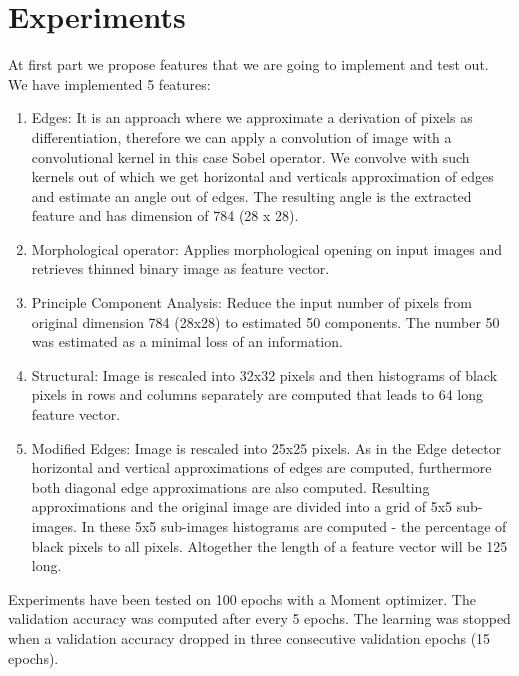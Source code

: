 \documentclass[journal]{IEEEtran}
\begin{document}
\section{Experiments}
At first part we propose features that we are going to implement and test out. We have implemented 5 features:
\begin{enumerate}
\item{Edges:}
	It is an approach where we approximate a derivation of pixels as differentiation, therefore we can apply a convolution of image with a convolutional kernel in this case Sobel operator. We convolve with such kernels out of which we get horizontal and verticals approximation of edges and estimate an angle out of edges. The resulting angle is the extracted feature and has dimension of 784 (28 x 28).
\item{Morphological operator:}
	Applies morphological opening on input images and retrieves thinned binary image as feature vector.
\item{Principle Component Analysis:}
	Reduce the input number of pixels from original dimension 784 (28x28) to estimated 50 components. The number 50 was estimated as a minimal loss of an information.
\item{Structural\cite{features}:}
	Image is rescaled into 32x32 pixels and then histograms of black pixels in rows and columns separately are computed that leads to 64 long feature vector.
\item{Modified Edges\cite{features}:}
	Image is rescaled into 25x25 pixels. As in the Edge detector horizontal and vertical approximations of edges are computed, furthermore both diagonal edge approximations are also computed. Resulting approximations and the original image are divided into a grid of 5x5 sub-images. In these 5x5 sub-images histograms are computed - the percentage of black pixels to all pixels. Altogether the length of a feature vector will be 125 long.
\end{enumerate}

Experiments have been tested on 100 epochs with a Moment optimizer. The validation accuracy was computed after every 5 epochs. The learning was stopped when a validation accuracy dropped in three consecutive validation epochs (15 epochs).
\end{document}
